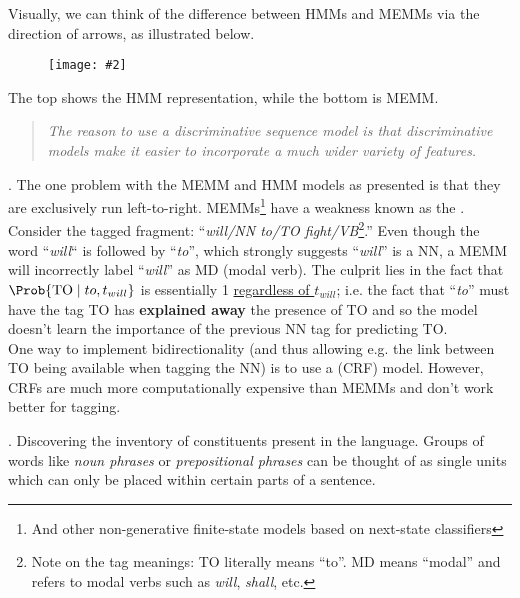 \documentclass[11pt]{article}
\newcommand\myfig[2][0.3\textwidth]{\begin{figure}[h!]\centering\texttt{[image: \#2]}\end{figure}}
\newcommand\myspace[1][]{\vspace{#1\bigskipamount}}
\newcommand\p{\Needspace{10\baselineskip} \noindent}
\begin{document}
Visually, we can think of the difference between HMMs and MEMMs via the direction of arrows, as illustrated below.

\myfig[0.5\textwidth]{hmm_memm.png}

\p The top shows the HMM representation, while the bottom is MEMM. 
\vspace{-1em}
\begin{quote}
	{\small \textit{The reason to use a discriminative sequence model is that discriminative models
	make it easier to incorporate a much wider variety of features.}}
\end{quote}


\myspace
\p {}. The one problem with the MEMM and HMM models as presented is that they are exclusively run left-to-right. MEMMs\footnote{And other non-generative finite-state models based on next-state classifiers} have a weakness known as the . Consider the tagged fragment: ``\textit{will/NN to/TO fight/VB}\footnote{Note on the tag meanings: TO literally means ``to''. MD means ``modal'' and refers to modal verbs such as \textit{will}, \textit{shall}, etc.}.'' Even though the word ``\textit{will}`` is followed by ``\textit{to}'', which strongly suggests ``\textit{will}'' is a NN, a MEMM will incorrectly label ``\textit{will}'' as MD (modal verb). The culprit lies in the fact that $\Prob{\text{TO} \mid to, t_{will}}$ is essentially 1 \underline{regardless of $t_{will}$}; i.e. the fact that ``\textit{to}'' must have the tag TO has \textbf{explained away} the presence of TO and so the model doesn't learn the importance of the previous NN tag for predicting TO.\\

\p One way to implement bidirectionality (and thus allowing e.g. the link between TO being available when tagging the NN) is to use a  (CRF) model. However, CRFs are much more computationally expensive than MEMMs and don't work better for tagging.







\p {}. Discovering the inventory of constituents present in the language. Groups of words like \textit{noun phrases} or \textit{prepositional phrases} can be thought of as single units which can only be placed within certain parts of a sentence. \\
\end{document}
